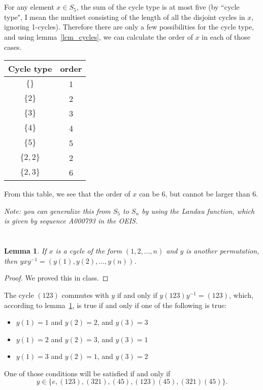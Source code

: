 \documentclass[12pt]{article}
\newtheorem{lem}[thm]{Lemma}
\begin{document}
\section{}
\noindent{}\bigskip

For any element $x \in S_5$, the sum of the cycle type is at most five (by ``cycle type", I mean the multiset consisting of the length of all the disjoint cycles in $x$, ignoring 1-cycles). Therefore there are only a few possibilities for the cycle type, and using lemma~\ref{lcm_cycles}, we can calculate the order of $x$ in each of those cases.

\bigskip
{\centering
\begin{tabular}{|c|c|}
    \hline
    Cycle type & order \\
    \hline
    \hline
    $\{\}$ & 1 \\
    $\{2\}$ & 2 \\
    $\{3\}$ & 3 \\
    $\{4\}$ & 4 \\
    $\{5\}$ & 5 \\
    $\{2,2\}$ & 2 \\
    $\{2,3\}$ & 6 \\
    \hline
\end{tabular}\par}
\bigskip

From this table, we see that the order of $x$ can be 6, but cannot be larger than 6.
\par
\textit{Note: you can generalize this from $S_5$ to $S_n$ by using the Landau function, which is given by sequence A000793 in the OEIS.}

\section{}
\noindent{}\bigskip

\begin{lem}\label{conjugation}
    If $x$ is a cycle of the form $(1,2,\dots,n)$ and $y$ is another permutation, then $yxy^{-1} = (y(1),y(2),\dots,y(n))$. 
\end{lem}
\begin{proof}
    We proved this in class.
\end{proof}

The cycle $(123)$ commutes with $y$ if and only if $y(123)y^{-1}=(123)$, which, according to lemma~\ref{conjugation}, is true if and only if one of the following is true:
\begin{itemize}
    \item $y(1)=1$ and $y(2)=2$, and $y(3)=3$
    \item $y(1)=2$ and $y(2)=3$, and $y(3)=1$
    \item $y(1)=3$ and $y(2)=1$, and $y(3)=2$
\end{itemize}
One of those conditions will be satisfied if and only if
\[ y \in \{ e, (123), (321), (45), (123)(45), (321)(45) \}. \]
\end{document}
